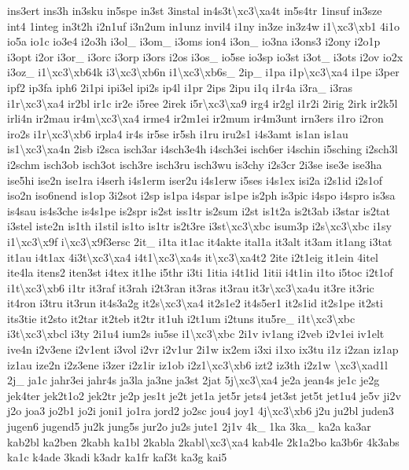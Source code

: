 {ins3ert ins3h in3sku in5spe in3st 3instal in4s3t\textbackslash{}xc3\textbackslash{}xa4t in5s4tr 1insuf in3sze int4 1integ in3t2h i2n1uf i3n2um in1unz invil4 i1ny in3ze in3z4w i1\textbackslash{}xc3\textbackslash{}xb1 4i1o io5a io1c io3e4 i2o3h i3ol\-\_\- i3om\-\_\- i3oms ion4 i3on\-\_\- io3na i3ons3 i2ony i2o1p i3opt i2or i3or\-\_\- i3orc i3orp i3ors i2os i3os\-\_\- io5se io3sp io3st i3ot\-\_\- i3ots i2ov io2x i3oz\-\_\- i1\textbackslash{}xc3\textbackslash{}xb64k i3\textbackslash{}xc3\textbackslash{}xb6n i1\textbackslash{}xc3\textbackslash{}xb6s\-\_\- 2ip\-\_\- i1pa i1p\textbackslash{}xc3\textbackslash{}xa4 i1pe i3per ipf2 ip3fa iph6 2i1pi ipi3el ipi2s ip4l i1pr 2ips 2ipu i1q i1r4a i3ra\-\_\- i3ras i1r\textbackslash{}xc3\textbackslash{}xa4 ir2bl ir1c ir2e i5ree 2irek i5r\textbackslash{}xc3\textbackslash{}xa9 irg4 ir2gl i1r2i 2irig 2irk ir2k5l irli4n ir2mau ir4m\textbackslash{}xc3\textbackslash{}xa4 irme4 ir2m1ei ir2mum ir4m3unt irn3ers i1ro i2ron iro2s i1r\textbackslash{}xc3\textbackslash{}xb6 irpla4 ir4s ir5se ir5sh i1ru iru2s1 i4s3amt is1an is1au is1\textbackslash{}xc3\textbackslash{}xa4n 2isb i2sca isch3ar i4sch3e4h i4sch3ei isch6er i4schin i5sching i2sch3l i2schm isch3ob isch3ot isch3re isch3ru isch3wu is3chy i2s3cr 2i3se ise3e ise3ha ise5hi ise2n ise1ra i4serh i4s1erm iser2u i4s1erw i5ses i4s1ex isi2a i2s1id i2s1of iso2n iso6nend is1op 3i2sot i2sp is1pa i4spar is1pe is2ph is3pic i4spo i4spro is3sa is4sau is4s3che is4s1pe is2spr is2st iss1tr is2sum i2st is1t2a is2t3ab i3star is2tat i3stel iste2n is1th i1stil is1to is1tr is2t3re i3st\textbackslash{}xc3\textbackslash{}xbc isum3p i2s\textbackslash{}xc3\textbackslash{}xbc i1sy i1\textbackslash{}xc3\textbackslash{}x9f i\textbackslash{}xc3\textbackslash{}x9f3ersc 2it\-\_\- i1ta it1ac it4akte ital1a it3alt it3am it1ang i3tat it1au i4t1ax 4i3t\textbackslash{}xc3\textbackslash{}xa4 i4t1\textbackslash{}xc3\textbackslash{}xa4s it\textbackslash{}xc3\textbackslash{}xa4t2 2ite i2t1eig it1ein 4itel ite4la itens2 iten3st i4tex it1he i5thr i3ti 1itia i4t1id 1itii i4t1in i1to i5toc i2t1of i1t\textbackslash{}xc3\textbackslash{}xb6 i1tr it3raf it3rah i2t3ran it3ras it3rau it3r\textbackslash{}xc3\textbackslash{}xa4u it3re it3ric it4ron i3tru it3run it4s3a2g it2s\textbackslash{}xc3\textbackslash{}xa4 it2s1e2 it4s5er1 it2s1id it2s1pe it2sti its3tie it2sto it2tar it2teb it2tr it1uh i2t1um i2tuns itu5re\-\_\- i1t\textbackslash{}xc3\textbackslash{}xbc i3t\textbackslash{}xc3\textbackslash{}xbcl i3ty 2i1u4 ium2s iu5se i1\textbackslash{}xc3\textbackslash{}xbc 2i1v iv1ang i2veb i2v1ei iv1elt ive4n i2v3ene i2v1ent i3vol i2vr i2v1ur 2i1w ix2em i3xi i1xo ix3tu i1z i2zan iz1ap iz1au ize2n i2z3ene i3zer i2z1ir iz1ob i2z1\textbackslash{}xc3\textbackslash{}xb6 izt2 iz3th i2z1w \textbackslash{}xc3\textbackslash{}xad1l 2j\-\_\- ja1c jahr3ei jahr4s ja3la ja3ne ja3st 2jat 5j\textbackslash{}xc3\textbackslash{}xa4 je2a jean4s je1c je2g jek4ter jek2t1o2 jek2tr je2p jes1t je2t jet1a jet5r jets4 jet3st jet5t jet1u4 je5v ji2v j2o joa3 jo2b1 jo2i joni1 jo1ra jord2 jo2sc jou4 joy1 4j\textbackslash{}xc3\textbackslash{}xb6 j2u ju2bl juden3 jugen6 jugend5 ju2k jung5s jur2o ju2s jute1 2j1v 4k\-\_\- 1ka 3ka\-\_\- ka2a ka3ar kab2bl ka2ben 2kabh ka1bl 2kabla 2kabl\textbackslash{}xc3\textbackslash{}xa4 kab4le 2k1a2bo ka3b6r 4k3abs ka1c k4ade 3kadi k3adr ka1fr kaf3t ka3g kai5 }
